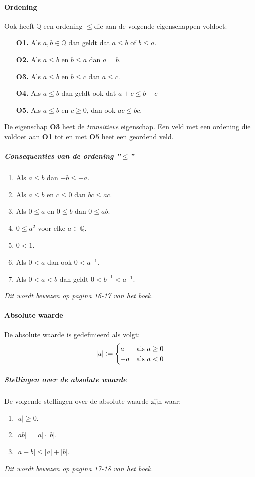 \paragraph{Ordening}Ook heeft $\mathbb{Q}$ een ordening \bq$\leq$\eq die aan de volgende eigenschappen voldoet:
\begin{itemize}
    \setlength\itemsep{0em}
    \item[\textbf{O1.}] Als $a,b\in\mathbb{Q}$ dan geldt dat $a \leq b$ of $b \leq a$.
    \item[\textbf{O2.}] Als $a \leq b$ en $b \leq a$ dan $a=b$.
    \item[\textbf{O3.}] Als $a \leq b$ en $b \leq c$ dan $a \leq c$.
    \item[\textbf{O4.}] Als $a \leq b$ dan geldt ook dat $a+c \leq b+c$
    \item[\textbf{O5.}] Als $a \leq b$ en $c \geq 0$, dan ook $ac \leq bc$.
\end{itemize}
De eigenschap \textbf{O3} heet de \textit{transitieve} eigenschap. Een veld met een ordening die voldoet aan \textbf{O1} tot en met \textbf{O5} heet een geordend veld.

\subparagraph{Consequenties van de ordening ''$\leq$''}
\begin{enumerate}
    \setlength\itemsep{0em}
    \item Als $a \leq b$ dan $-b \leq -a$.
    \item Als $a \leq b$ en $c\leq0$ dan $bc \leq ac$.
    \item Als $0 \leq a$ en $0 \leq b$ dan $0 \leq ab$.
    \item $0 \leq a^{2}$ voor elke $a\in\mathbb{Q}$.
    \item $0<1$.
    \item Als $0 < a$ dan ook $0 < a^{-1}$.
    \item Als $0<a<b$ dan geldt $0<b^{-1}<a^{-1}$.
\end{enumerate}
\textit{Dit wordt bewezen op pagina 16-17 van het boek.}

\paragraph{Absolute waarde} De absolute waarde is gedefinieerd als volgt:
$$
|a|\vcentcolon=
\begin{cases}
    a & \text{als } a\geq 0\\
    -a & \text{als } a<0
\end{cases}
$$
\subparagraph{Stellingen over de absolute waarde} De volgende stellingen over de absolute waarde zijn waar:
\begin{enumerate}
    \setlength\itemsep{0em}
    \item $|a|\geq0$.
    \item $|ab|=|a|\cdot|b|$.
    \item $|a+b|\leq|a|+|b|$.
\end{enumerate}
\textit{Dit wordt bewezen op pagina 17-18 van het boek.}

